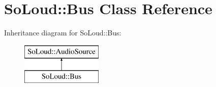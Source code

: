 \hypertarget{class_so_loud_1_1_bus}{}\section{So\+Loud\+:\+:Bus Class Reference}
\label{class_so_loud_1_1_bus}
Inheritance diagram for So\+Loud\+:\+:Bus\+:\begin{figure}[H]
\begin{center}
\leavevmode
\includegraphics[height=2.000000cm]{class_so_loud_1_1_bus}
\end{center}
\end{figure}
